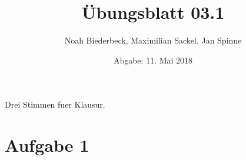 \documentclass{scrartcl}
\title{Übungsblatt 03.1}
\author{%
  Noah Biederbeck, Maximilian Sackel, Jan Spinne
}
\date{Abgabe: 11. Mai 2018}
\begin{document}
\maketitle

Drei Stimmen fuer Klausur.

\section*{Aufgabe 1}
\end{document}
